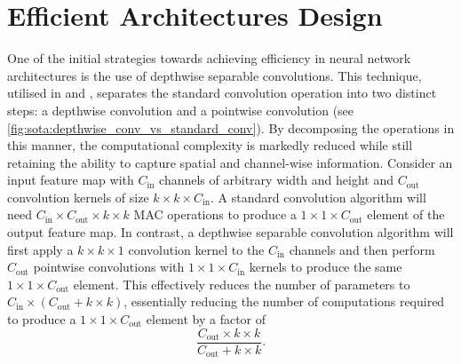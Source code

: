 

\section{Efficient Architectures Design}


One of the initial strategies towards achieving efficiency in neural network
architectures is the use of depthwise separable convolutions. This technique,
utilised in \cite{howard2017mobilenets} and \cite{DBLP:conf/icml/TanL19},
separates the standard convolution operation into two distinct steps: a
depthwise convolution and a pointwise convolution (see
\cref{fig:sota:depthwise_conv_vs_standard_conv}). By decomposing the operations
in this manner, the computational complexity is markedly reduced while still
retaining the ability to capture spatial and channel-wise information. Consider
an input feature map with $C_\text{in}$ channels of arbitrary width and height
and $C_\text{out}$ convolution kernels of size $k\times k \times C_\text{in}$. A
standard convolution algorithm will need $C_\text{in} \times C_\text{out} \times
k \times k$ \ac{MAC} operations to produce a $1 \times 1 \times C_\text{out}$
element of the output feature map. In contrast, a depthwise separable
convolution algorithm will first apply a $k\times k \times 1$ convolution kernel
to the $C_\text{in}$ channels and then perform $C_\text{out}$ pointwise
convolutions with $1\times 1 \times C_\text{in}$ kernels to produce the same
$1\times 1 \times C_\text{out}$ element. This effectively reduces the number of
parameters to $C_\text{in} \times (C_\text{out} + k \times k)$, essentially
reducing the number of computations required to produce a $1 \times 1 \times
C_\text{out}$ element by a factor of\\

$$\displaystyle\frac{C_\text{out}\times k \times k}{C_\text{out} + k \times k}.$$\\

